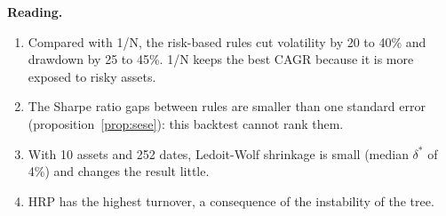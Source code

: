 \documentclass[11pt,a4paper]{article}
\theoremstyle{pdef}
\theoremstyle{pstate}
\newcommand{\pct}{\%}
\begin{document}
\textbf{Reading.}
\begin{enumerate}
\item Compared with 1/N, the risk-based rules cut volatility by 20 to 40\pct{} and
drawdown by 25 to 45\pct. 1/N keeps the best CAGR because it is more exposed to risky
assets.
\item The Sharpe ratio gaps between rules are smaller than one standard error
(proposition~\ref{prop:sese}): this backtest cannot rank them.
\item With 10 assets and 252 dates, Ledoit-Wolf shrinkage is small (median $\delta^\ast$
of 4\pct) and changes the result little.
\item HRP has the highest turnover, a consequence of the instability of the tree.
\end{enumerate}

\clearpage
{}
{}
\end{document}
